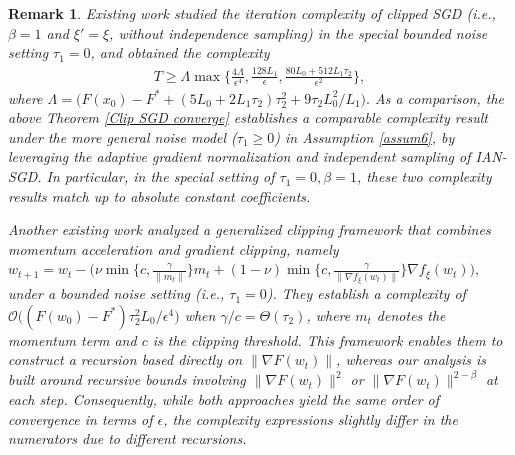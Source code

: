 \documentclass[10pt]{article} %
\newtheorem{remark}{Remark}
\begin{document}
\begin{remark}
Existing work \citep{zhang2020gradientclippingacceleratestraining} studied the iteration complexity of clipped SGD (i.e., $\beta=1$ and $\xi' = \xi$, without independence sampling) in the special bounded noise setting $\tau_1 = 0$, and obtained the complexity 
\begin{align}
    T\geq \Lambda \max\Big\{ \frac{4 \Lambda}{\epsilon^4},\frac{128 L_1}{\epsilon}, \frac{80 L_0 + 512 L_1 \tau_2}{\epsilon^2} \Big\},
\end{align}
where $\Lambda  = \big( F(x_0) - F^* + (5L_0 + 2L_1 \tau_2) \tau_2^2 + 9 \tau_2{L_0^2}/{L_1} \big).
$
As a comparison, the above Theorem \ref{Clip SGD converge} establishes a comparable complexity result under the more general noise model ($\tau_1 \geq 0$) in Assumption \ref{assum6}, by leveraging the adaptive gradient normalization and independent sampling of IAN-SGD. In particular, in the special setting of $\tau_1=0, \beta=1$, these two complexity results match up to absolute constant coefficients. 

Another existing work \citet{genralclip} analyzed a generalized clipping framework that combines momentum acceleration and gradient clipping, namely
$
w_{t+1} = w_t - \big( \nu \min\big\{c, \tfrac{\gamma}{\|m_t\|} \big\} m_t + (1 - \nu) \min\big\{c, \tfrac{\gamma}{\|\nabla f_{\xi}(w_t)\|} \big\} \nabla f_{\xi}(w_t) \big),
$
under a bounded noise setting (i.e., $\tau_1 = 0$). They establish a complexity of $\mathcal{O}\big((F(w_0) - F^*) \tau_2^2 L_0 / \epsilon^4\big)$ when $\gamma / c = \Theta(\tau_2)$, where $m_t$ denotes the momentum term and $c$ is the clipping threshold. This framework enables them to construct a recursion based directly on $\|\nabla F(w_t)\|$, whereas our analysis is built around recursive bounds involving $\|\nabla F(w_t)\|^2$ or $\|\nabla F(w_t)\|^{2 - \beta}$ at each step. Consequently, while both approaches yield the same order of convergence in terms of $\epsilon$, the complexity expressions slightly differ in the numerators due to different recursions.





\end{remark}
\end{document}
